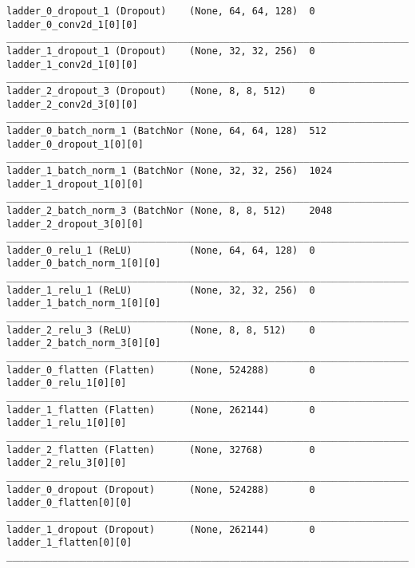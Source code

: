 \begin{lstlisting}[caption={CelebA-\ac{VLAE} Encoder},captionpos=b,basicstyle=\tiny, label={lst:celeba-vlae-encoder}]
ladder_0_dropout_1 (Dropout)    (None, 64, 64, 128)  0           ladder_0_conv2d_1[0][0]
__________________________________________________________________________________________________
ladder_1_dropout_1 (Dropout)    (None, 32, 32, 256)  0           ladder_1_conv2d_1[0][0]
__________________________________________________________________________________________________
ladder_2_dropout_3 (Dropout)    (None, 8, 8, 512)    0           ladder_2_conv2d_3[0][0]
__________________________________________________________________________________________________
ladder_0_batch_norm_1 (BatchNor (None, 64, 64, 128)  512         ladder_0_dropout_1[0][0]
__________________________________________________________________________________________________
ladder_1_batch_norm_1 (BatchNor (None, 32, 32, 256)  1024        ladder_1_dropout_1[0][0]
__________________________________________________________________________________________________
ladder_2_batch_norm_3 (BatchNor (None, 8, 8, 512)    2048        ladder_2_dropout_3[0][0]
__________________________________________________________________________________________________
ladder_0_relu_1 (ReLU)          (None, 64, 64, 128)  0           ladder_0_batch_norm_1[0][0]
__________________________________________________________________________________________________
ladder_1_relu_1 (ReLU)          (None, 32, 32, 256)  0           ladder_1_batch_norm_1[0][0]
__________________________________________________________________________________________________
ladder_2_relu_3 (ReLU)          (None, 8, 8, 512)    0           ladder_2_batch_norm_3[0][0]
__________________________________________________________________________________________________
ladder_0_flatten (Flatten)      (None, 524288)       0           ladder_0_relu_1[0][0]
__________________________________________________________________________________________________
ladder_1_flatten (Flatten)      (None, 262144)       0           ladder_1_relu_1[0][0]
__________________________________________________________________________________________________
ladder_2_flatten (Flatten)      (None, 32768)        0           ladder_2_relu_3[0][0]
__________________________________________________________________________________________________
ladder_0_dropout (Dropout)      (None, 524288)       0           ladder_0_flatten[0][0]
__________________________________________________________________________________________________
ladder_1_dropout (Dropout)      (None, 262144)       0           ladder_1_flatten[0][0]
__________________________________________________________________________________________________

\end{lstlisting}
